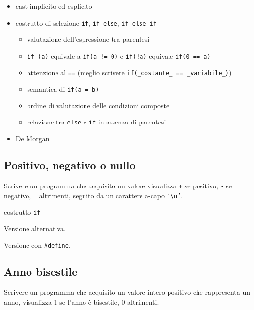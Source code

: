 \begin{itemize}
\item cast implicito ed esplicito
\item costrutto di selezione \texttt{if}, \texttt{if-else}, \texttt{if-else-if}
    \begin{itemize}
    \item valutazione dell'espressione tra parentesi
    \item \texttt{if (a)} equivale a \texttt{if(a != 0)} e \texttt{if(!a)} equivale \texttt{if(0 == a)} 
    \item attenzione al \texttt{==} (meglio scrivere \texttt{if(\_costante\_ == \_variabile\_)})
    \item semantica di \texttt{if(a = b)}
    \item ordine di valutazione delle condizioni composte
    \item relazione tra \texttt{else} e \texttt{if} in assenza di parentesi
    \end{itemize}
\item De Morgan
\end{itemize}

\mysep{}

\subsection{Positivo, negativo o nullo}
Scrivere un programma che acquisito un valore visualizza \texttt{+} se positivo, \texttt{-} se negativo, \texttt{\ } altrimenti, seguito da un carattere a-capo \texttt{'\textbackslash n'}.

\begin{tags}
costrutto \texttt{if}
\end{tags}



Versione alternativa.



Versione con \texttt{\#define}.



\subsection{Anno bisestile}
Scrivere un programma che acquisito un valore intero positivo che rappresenta un anno, visualizza 1 se l'anno \`e bisestile, 0 altrimenti.

